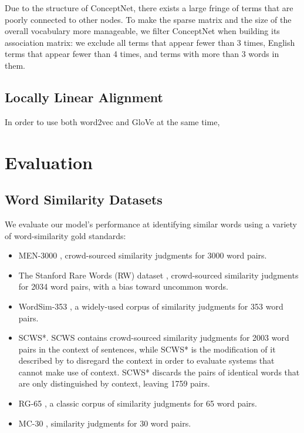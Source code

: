 \documentclass[11pt,letterpaper]{article}
\begin{document}
Due to the structure of ConceptNet, there exists a large fringe of terms that are
poorly connected to other nodes. To make the sparse matrix and the size of the
overall vocabulary more manageable, we filter ConceptNet when building its
association matrix: we exclude all terms that appear fewer than 3 times, English
terms that appear fewer than 4 times, and terms with more than 3 words in them.

\subsection{Locally Linear Alignment}

In order to use both word2vec and GloVe at the same time, %

\section{Evaluation}

\subsection{Word Similarity Datasets}

We evaluate our model's performance at identifying similar words using a
variety of word-similarity gold standards:

\begin{itemize}
\item MEN-3000 \cite{bruni2014men}, crowd-sourced similarity judgments for 3000
    word pairs.
\item The Stanford Rare Words (RW) dataset \cite{luong2013rw}, crowd-sourced
    similarity judgments for 2034 word pairs, with a bias toward uncommon words.
\item WordSim-353 \cite{finkelstein2001ws}, a widely-used corpus of similarity
    judgments for 353 word pairs.
\item SCWS*. SCWS \cite{huang2012scws} contains crowd-sourced similarity
    judgments for 2003 word pairs in the context of sentences, while SCWS* is
    the modification of it described by 
    to disregard the context in order to evaluate
    systems that cannot make use of context. SCWS* discards the pairs of
    identical words that are only distinguished by context, leaving 1759 pairs.
\item RG-65 \cite{rubenstein1965rg}, a classic corpus of similarity judgments
    for 65 word pairs.
\item MC-30 \cite{miller1991mc}, similarity judgments for 30 word pairs.
\end{itemize}
\end{document}
